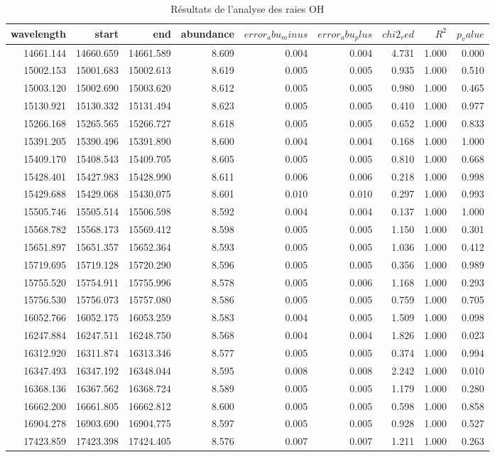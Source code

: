 \begin{table}
\caption{Résultats de l'analyse des raies OH}
\label{tab:resultats_OH}
\begin{tabular}{rrrrrrrrr}
\toprule
wavelength & start & end & abundance & $error_abu_minus$ & $error_abu_plus$ & $chi2_red$ & $R^2$ & $p_value$ \\
\midrule
14661.144 & 14660.659 & 14661.589 & 8.609 & 0.004 & 0.004 & 4.731 & 1.000 & 0.000 \\
15002.153 & 15001.683 & 15002.613 & 8.619 & 0.005 & 0.005 & 0.935 & 1.000 & 0.510 \\
15003.120 & 15002.690 & 15003.620 & 8.612 & 0.005 & 0.005 & 0.980 & 1.000 & 0.465 \\
15130.921 & 15130.332 & 15131.494 & 8.623 & 0.005 & 0.005 & 0.410 & 1.000 & 0.977 \\
15266.168 & 15265.565 & 15266.727 & 8.618 & 0.005 & 0.005 & 0.652 & 1.000 & 0.833 \\
15391.205 & 15390.496 & 15391.890 & 8.600 & 0.004 & 0.004 & 0.168 & 1.000 & 1.000 \\
15409.170 & 15408.543 & 15409.705 & 8.605 & 0.005 & 0.005 & 0.810 & 1.000 & 0.668 \\
15428.401 & 15427.983 & 15428.990 & 8.611 & 0.006 & 0.006 & 0.218 & 1.000 & 0.998 \\
15429.688 & 15429.068 & 15430.075 & 8.601 & 0.010 & 0.010 & 0.297 & 1.000 & 0.993 \\
15505.746 & 15505.514 & 15506.598 & 8.592 & 0.004 & 0.004 & 0.137 & 1.000 & 1.000 \\
15568.782 & 15568.173 & 15569.412 & 8.598 & 0.005 & 0.005 & 1.150 & 1.000 & 0.301 \\
15651.897 & 15651.357 & 15652.364 & 8.593 & 0.005 & 0.005 & 1.036 & 1.000 & 0.412 \\
15719.695 & 15719.128 & 15720.290 & 8.596 & 0.005 & 0.005 & 0.356 & 1.000 & 0.989 \\
15755.520 & 15754.911 & 15755.996 & 8.578 & 0.005 & 0.006 & 1.168 & 1.000 & 0.293 \\
15756.530 & 15756.073 & 15757.080 & 8.586 & 0.005 & 0.005 & 0.759 & 1.000 & 0.705 \\
16052.766 & 16052.175 & 16053.259 & 8.583 & 0.004 & 0.005 & 1.509 & 1.000 & 0.098 \\
16247.884 & 16247.511 & 16248.750 & 8.568 & 0.004 & 0.004 & 1.826 & 1.000 & 0.023 \\
16312.920 & 16311.874 & 16313.346 & 8.577 & 0.005 & 0.005 & 0.374 & 1.000 & 0.994 \\
16347.493 & 16347.192 & 16348.044 & 8.595 & 0.008 & 0.008 & 2.242 & 1.000 & 0.010 \\
16368.136 & 16367.562 & 16368.724 & 8.589 & 0.005 & 0.005 & 1.179 & 1.000 & 0.280 \\
16662.200 & 16661.805 & 16662.812 & 8.600 & 0.005 & 0.005 & 0.598 & 1.000 & 0.858 \\
16904.278 & 16903.690 & 16904.775 & 8.597 & 0.005 & 0.005 & 0.928 & 1.000 & 0.527 \\
17423.859 & 17423.398 & 17424.405 & 8.576 & 0.007 & 0.007 & 1.211 & 1.000 & 0.263 \\
\bottomrule
\end{tabular}
\end{table}
